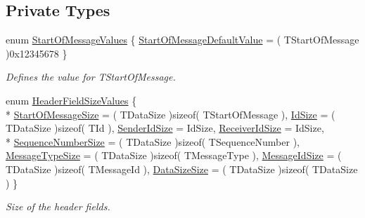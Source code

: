 \subsection*{Private Types}
\begin{DoxyCompactItemize}
\item 
enum \hyperlink{class_terra_swarm_1_1_message_header_acc3f58a1107fca3a112e3b68b80be3bf}{Start\-Of\-Message\-Values} \{ \hyperlink{class_terra_swarm_1_1_message_header_acc3f58a1107fca3a112e3b68b80be3bfa4f866bfd6f54d1a723c05eea30a17e6d}{Start\-Of\-Message\-Default\-Value} = ( T\-Start\-Of\-Message )0x12345678
 \}
\begin{DoxyCompactList}\small\item\em Defines the value for T\-Start\-Of\-Message. \end{DoxyCompactList}\item 
enum \hyperlink{class_terra_swarm_1_1_message_header_a189acad5bd9f60fe47b3381da62d3484}{Header\-Field\-Size\-Values} \{ \\*
\hyperlink{class_terra_swarm_1_1_message_header_a189acad5bd9f60fe47b3381da62d3484a66c01670e26436cba7028bb19c238cef}{Start\-Of\-Message\-Size} = ( T\-Data\-Size )sizeof( T\-Start\-Of\-Message ), 
\hyperlink{class_terra_swarm_1_1_message_header_a189acad5bd9f60fe47b3381da62d3484a9c06599a19b72607a6244f5d30a7bc0a}{Id\-Size} = ( T\-Data\-Size )sizeof( T\-Id ), 
\hyperlink{class_terra_swarm_1_1_message_header_a189acad5bd9f60fe47b3381da62d3484a51b6e5f4bb02d1e98de93c3de237bf3c}{Sender\-Id\-Size} = Id\-Size, 
\hyperlink{class_terra_swarm_1_1_message_header_a189acad5bd9f60fe47b3381da62d3484aa9ca8b3cb72a1ff173d84c8ca71f96d5}{Receiver\-Id\-Size} = Id\-Size, 
\\*
\hyperlink{class_terra_swarm_1_1_message_header_a189acad5bd9f60fe47b3381da62d3484ab930e6de45a4e449f3a576e38ba4d3a5}{Sequence\-Number\-Size} = ( T\-Data\-Size )sizeof( T\-Sequence\-Number ), 
\hyperlink{class_terra_swarm_1_1_message_header_a189acad5bd9f60fe47b3381da62d3484ad45da22415ac87cda0dc06e3e6047947}{Message\-Type\-Size} = ( T\-Data\-Size )sizeof( T\-Message\-Type ), 
\hyperlink{class_terra_swarm_1_1_message_header_a189acad5bd9f60fe47b3381da62d3484a9008a5ec8c433f7c7f74c1c150581ea2}{Message\-Id\-Size} = ( T\-Data\-Size )sizeof( T\-Message\-Id ), 
\hyperlink{class_terra_swarm_1_1_message_header_a189acad5bd9f60fe47b3381da62d3484a3ef403fe13fcd865a980e28ad63dac48}{Data\-Size\-Size} = ( T\-Data\-Size )sizeof( T\-Data\-Size )
 \}
\begin{DoxyCompactList}\small\item\em Size of the header fields. \end{DoxyCompactList}\item 

\end{DoxyCompactItemize}
